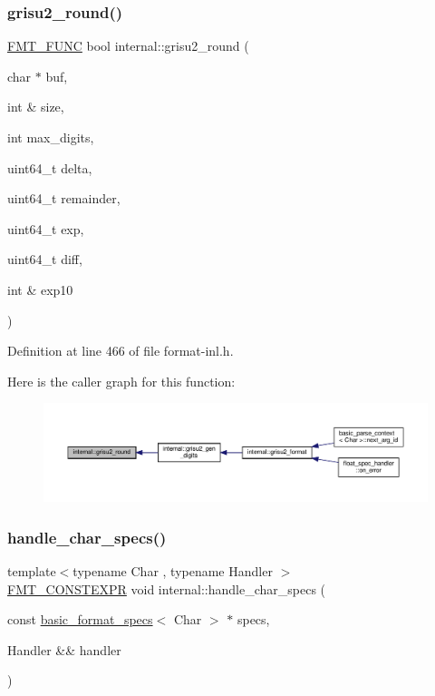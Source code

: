 \subsubsection{\texorpdfstring{grisu2\+\_\+round()}{grisu2\_round()}}
{\footnotesize\ttfamily \hyperlink{format_8h_a02c8898388e0ae59aab58be14fcd4e05}{F\+M\+T\+\_\+\+F\+U\+NC} bool internal\+::grisu2\+\_\+round (\begin{DoxyParamCaption}\item[{char $\ast$}]{buf,  }\item[{int \&}]{size,  }\item[{int}]{max\+\_\+digits,  }\item[{uint64\+\_\+t}]{delta,  }\item[{uint64\+\_\+t}]{remainder,  }\item[{uint64\+\_\+t}]{exp,  }\item[{uint64\+\_\+t}]{diff,  }\item[{int \&}]{exp10 }\end{DoxyParamCaption})}



Definition at line 466 of file format-\/inl.\+h.

Here is the caller graph for this function\+:
\nopagebreak
\begin{figure}[H]
\begin{center}
\leavevmode
\includegraphics[width=350pt]{namespaceinternal_afc76db0ad587455f6942b74d175ee56a_icgraph}
\end{center}
\end{figure}
\mbox{\label{namespaceinternal_a0b130c25d32481413e2527484a1ec22b}} 
\subsubsection{\texorpdfstring{handle\+\_\+char\+\_\+specs()}{handle\_char\_specs()}}
{\footnotesize\ttfamily template$<$typename Char , typename Handler $>$ \\
\hyperlink{core_8h_a69201cb276383873487bf68b4ef8b4cd}{F\+M\+T\+\_\+\+C\+O\+N\+S\+T\+E\+X\+PR} void internal\+::handle\+\_\+char\+\_\+specs (\begin{DoxyParamCaption}\item[{const \hyperlink{structbasic__format__specs}{basic\+\_\+format\+\_\+specs}$<$ Char $>$ $\ast$}]{specs,  }\item[{Handler \&\&}]{handler }\end{DoxyParamCaption})}



